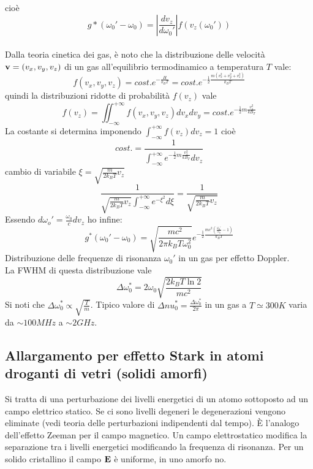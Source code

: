 cioè
\begin{equation*}
g*(\omega_0' - \omega_0) = \left|\frac{dv_z}{d\omega_0'} \right| f(v_z(\omega_0'))
\end{equation*}
\\
Dalla teoria cinetica dei gas, è noto che la distribuzione delle velocità $\mathbf{v} = (v_x, v_y, v_z)$ di un gas all'equilibrio termodinamico a temperatura $T$ vale:
\begin{equation*}
f(v_x, v_y, v_z) = cost. e^{-\frac{H}{k_B T}} = cost. e^{-\frac{1}{2} \frac{m(v_x^2 + v_y^2 + v_z^2)}{k_B T}}
\end{equation*}
quindi la distribuzioni ridotte di probabilità $f(v_z)$ vale
\begin{equation*}
f(v_z) = \iint_{-\infty}^{+\infty} f(v_x, v_y, v_z) dv_x dv_y = cost. e^{-\frac{1}{2} m\frac{v_z^2}{kB_ T}}
\end{equation*}
La costante si determina imponendo $\int_{-\infty}^{+\infty} f(v_z) dv_z = 1$ cioè
\begin{equation*}
cost. = \frac{1}{\int_{-\infty}^{+\infty} e^{-\frac{1}{2} m\frac{v_z^2}{kB_ T}} dv_z}
\end{equation*}
cambio di variabile $\xi = \sqrt{\frac{m}{2k_B T} v_z}$
\begin{equation*}
\frac{1}{\sqrt{\frac{m}{2k_B T} v_z} \int_{-\infty}^{+\infty} e^{-\xi^2} d\xi} = \frac{1}{\sqrt{\frac{m}{2k_B T} v_z}}
\end{equation*}
Essendo $d\omega_o' = \frac{\omega_0}{c} dv_z$ ho infine:
\begin{equation*}
g^*(\omega_0' - \omega_0) = \sqrt{\frac{mc^2}{2\pi k_B T \omega_0^2}} e^{-\frac{1}{2} \frac{mc^2 (\frac{\omega_0'}{\omega_0}-1)}{k_BT}}
\end{equation*}
Distribuzione delle frequenze di risonanza $\omega_0'$ in un gas per effetto Doppler.
\\
La FWHM di questa distribuzione vale
\begin{equation*}
\Delta \omega_0^* = 2\omega_0 \sqrt{\frac{2k_B T \ln 2}{mc^2}}
\end{equation*}
Si noti che $\Delta \omega_0^* \propto \sqrt{\frac{T}{m}}$. Tipico valore di $\Delta 	nu_0^* = \frac{\Delta \omega_0^*}{2\pi}$ in un gas a $T \simeq 300 K$ varia da $\sim 100 MHz$ a $\sim 2GHz$.

\subsection{Allargamento per effetto Stark in atomi droganti di vetri (solidi amorfi)}
Si tratta di una perturbazione dei livelli energetici di un atomo sottoposto ad un campo elettrico statico. Se ci sono livelli degeneri le degenerazioni vengono eliminate (vedi teoria delle perturbazioni indipendenti dal tempo). È l'analogo dell'effetto Zeeman per il campo magnetico. Un campo elettrostatico modifica la separazione tra i livelli energetici modificando la frequenza di risonanza. Per un solido cristallino il campo $\mathbf{E}$ è uniforme, in uno amorfo no.

